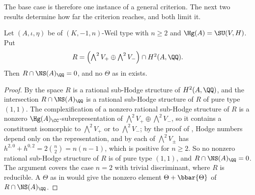 The base case is therefore one instance of a general criterion. The next two
results determine how far the criterion reaches, and both limit it.

\begin{proposition}\label{prop:divfails}
Let $(A,\iota,\eta)$ be of $(K,-1,n)$-Weil type with $n\ge2$ and
$\Hg(A)=\SU(V,H)$. Put
\[
  R=\Bigl(\textstyle\bigwedge^{2}V_{+}\oplus\bigwedge^{2}V_{-}\Bigr)
      \cap H^{2}(A,\QQ).
\]
Then $R\cap\NS(A)_{\QQ}=0$, and no $\Theta$ as in 
exists.
\end{proposition}

\begin{proof}
By  the space $R$ is a rational sub-Hodge structure of
$H^{2}(A,\QQ)$, and the intersection $R\cap\NS(A)_{\QQ}$ is a rational
sub-Hodge structure of $R$ of pure type $(1,1)$. The complexification of a
nonzero rational sub-Hodge structure of $R$ is a nonzero
$\Hg(A)_{\CC}$-subrepresentation of $\bigwedge^{2}V_{+}\oplus\bigwedge^{2}V_{-}$,
so it contains a constituent isomorphic to $\bigwedge^{2}V_{+}$ or to
$\bigwedge^{2}V_{-}$; by the proof of , Hodge numbers
depend only on the representation, and by  each of
$\bigwedge^{2}V_{\pm}$ has $h^{2,0}+h^{0,2}=2\binom{n}{2}=n(n-1)$, which is
positive for $n\ge2$. So no nonzero rational sub-Hodge structure of $R$ is of
pure type $(1,1)$, and $R\cap\NS(A)_{\QQ}=0$. The argument covers the case
$n=2$ with trivial discriminant, where $R$ is reducible. A $\Theta$ as in
 would give the nonzero element $\Theta+\bbar{\Theta}$
of $R\cap\NS(A)_{\QQ}$.
\end{proof}

